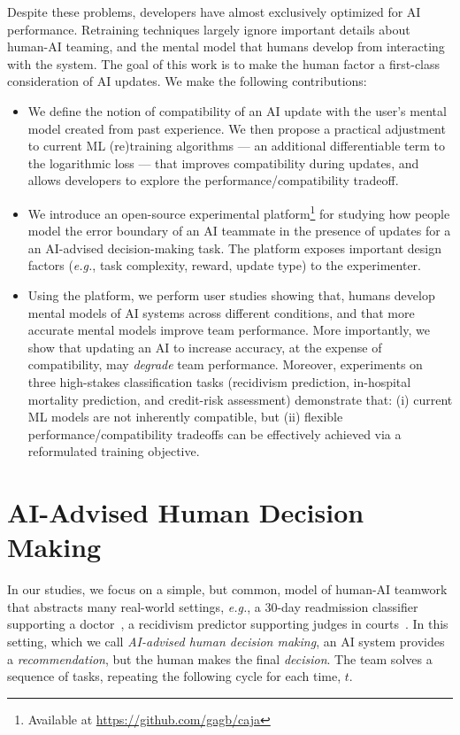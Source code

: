 \documentclass[letterpaper]{article}
\newcommand{\eg}{\mbox{\it e.g.}}
\newcommand{\name}{AI-advised human decision making}
\begin{document}
Despite these problems, developers have almost exclusively optimized for AI performance.  Retraining techniques largely ignore important details about human-AI teaming, and the mental model that humans develop from interacting with the system. %
The goal of this work is to make the human factor a first-class consideration of AI updates. We make the following contributions: 

\begin{itemize}
\item We define the notion of compatibility of an AI update with the user's mental model created from past experience.
We then propose a practical adjustment to current ML (re)training algorithms --- an additional differentiable term to the logarithmic loss --- that improves compatibility during updates, 
and allows developers to explore the performance/compatibility tradeoff.

\item We introduce an open-source experimental platform\footnote{Available at \url{https://github.com/gagb/caja}} for 
studying how people model the error boundary of an AI teammate in the presence of updates for a an AI-advised decision-making task. %
The platform exposes important design factors (\eg, task complexity, reward, update type) to the experimenter. 

\item Using the platform, we perform user studies showing that, humans develop mental models of AI systems across different conditions, and that more accurate mental models improve team performance. More importantly, we show that updating an AI to increase accuracy, at the expense of compatibility, may {\em degrade} team performance. 
 Moreover, experiments on three high-stakes classification tasks (recidivism prediction, in-hospital mortality prediction, and credit-risk assessment) demonstrate that: (i) current ML models are not inherently compatible, but (ii) flexible performance/compatibility tradeoffs can be effectively achieved via a reformulated training objective.


\end{itemize}


\section{AI-Advised Human Decision Making}

In our studies, we focus on a simple, but common, model of human-AI teamwork that abstracts many real-world settings,
\eg, a 30-day readmission classifier supporting a doctor~\cite{bayati2014data}, a recidivism predictor supporting judges in courts~\cite{angwin2016machine}. In this setting, which we call {\em \name}, an AI 
system provides a {\em recommendation}, but the human makes the final {\em decision}.
The team solves a sequence of tasks, repeating the following cycle for each time, $t$.
\end{document}
